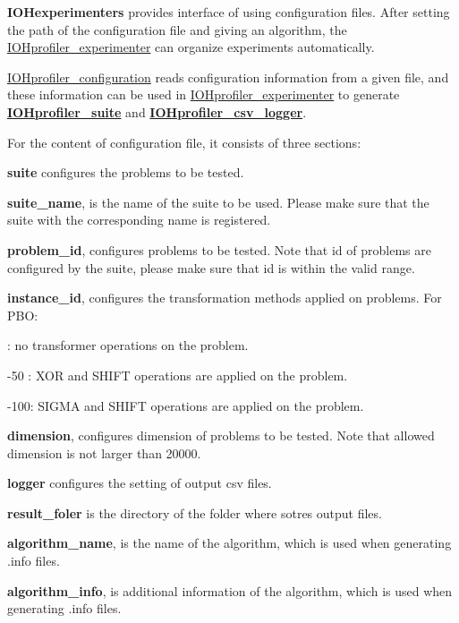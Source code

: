 {\bfseries{I\+O\+Hexperimenters}} provides interface of using configuration files. After setting the path of the configuration file and giving an algorithm, the {\ttfamily \mbox{\hyperlink{class_i_o_hprofiler__experimenter}{I\+O\+Hprofiler\+\_\+experimenter}}} can organize experiments automatically.

{\ttfamily \mbox{\hyperlink{class_i_o_hprofiler__configuration}{I\+O\+Hprofiler\+\_\+configuration}}} reads configuration information from a given file, and these information can be used in {\ttfamily \mbox{\hyperlink{class_i_o_hprofiler__experimenter}{I\+O\+Hprofiler\+\_\+experimenter}}} to generate {\bfseries{\mbox{\hyperlink{class_i_o_hprofiler__suite}{I\+O\+Hprofiler\+\_\+suite}}}} and {\bfseries{\mbox{\hyperlink{class_i_o_hprofiler__csv__logger}{I\+O\+Hprofiler\+\_\+csv\+\_\+logger}}}}.

For the content of configuration file, it consists of three sections\+:

{\bfseries{suite}} configures the problems to be tested.
\begin{DoxyItemize}
\item {\bfseries{suite\+\_\+name}}, is the name of the suite to be used. Please make sure that the suite with the corresponding name is registered.
\item {\bfseries{problem\+\_\+id}}, configures problems to be tested. Note that id of problems are configured by the suite, please make sure that id is within the valid range.
\item {\bfseries{instance\+\_\+id}}, configures the transformation methods applied on problems. For {\ttfamily P\+BO}\+:
\begin{DoxyItemize}
\item {} \+: no transformer operations on the problem.
\item {-\/50} \+: X\+OR and S\+H\+I\+FT operations are applied on the problem.
\item {-\/100}\+: S\+I\+G\+MA and S\+H\+I\+FT operations are applied on the problem.
\end{DoxyItemize}
\item {\bfseries{dimension}}, configures dimension of problems to be tested. Note that allowed dimension is not larger than 20000.
\end{DoxyItemize}

{\bfseries{logger}} configures the setting of output csv files.
\begin{DoxyItemize}
\item {\bfseries{result\+\_\+foler}} is the directory of the folder where sotres output files.
\item {\bfseries{algorithm\+\_\+name}}, is the name of the algorithm, which is used when generating \textquotesingle{}.info\textquotesingle{} files.
\item {\bfseries{algorithm\+\_\+info}}, is additional information of the algorithm, which is used when generating \textquotesingle{}.info\textquotesingle{} files.
\end{DoxyItemize}

